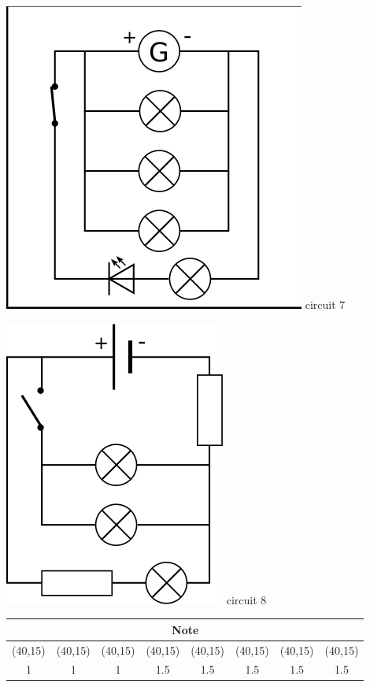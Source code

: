 \documentclass[10pt]{article}
\newcommand{\myboxtwo}{\makebox(40,15){}}
\begin{document}
\begin{center}
\begin{minipage}[c]{0.2\textwidth}
		\centering \includegraphics[width=0.8\columnwidth]{circuit7.png} circuit 7
	\end{minipage}
	\hspace{ 0pt}
	\begin{minipage}[c]{0.2\textwidth}
		\centering \includegraphics[width=0.7\columnwidth]{circuit8.png} circuit 8
	\end{minipage}
	\hspace{ 0pt}
\end{center}

\begin{center}	
		\begin{tabular}{@{}|c|c|c|c|c|c|c|c|@{}} \toprule
			\multicolumn{8}{|c|}{Note} \\ \midrule
			\myboxtwo & \myboxtwo & \myboxtwo & \myboxtwo & \myboxtwo & \myboxtwo & \myboxtwo & \myboxtwo \\ \midrule
			1& 1& 1 & 1.5 & 1.5 & 1.5 & 1.5 & 1.5  \\ \bottomrule
		\end{tabular}
\end{center}
\end{document}
